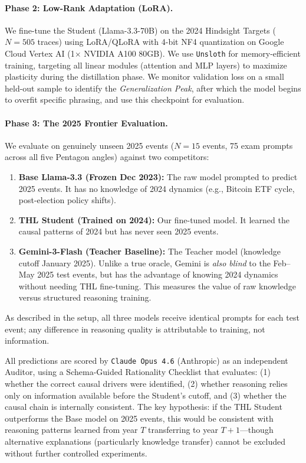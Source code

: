 \documentclass[11pt,a4paper]{article}
\begin{document}
\paragraph{Phase 2: Low-Rank Adaptation (LoRA).}
We fine-tune the Student (Llama-3.3-70B) on the 2024 Hindsight Targets ($N=505$ traces) using LoRA/QLoRA \cite{hu2022lora, dettmers2023qlora} with 4-bit NF4 quantization on Google Cloud Vertex AI (1$\times$ NVIDIA A100 80GB). We use \texttt{Unsloth} for memory-efficient training, targeting all linear modules (attention and MLP layers) to maximize plasticity during the distillation phase. We monitor validation loss on a small held-out sample to identify the \textit{Generalization Peak}, after which the model begins to overfit specific phrasing, and use this checkpoint for evaluation.

\paragraph{Phase 3: The 2025 Frontier Evaluation.}
We evaluate on genuinely unseen 2025 events ($N=15$ events, 75 exam prompts across all five Pentagon angles) against two competitors:
\begin{enumerate}
    \item \textbf{Base Llama-3.3 (Frozen Dec 2023):} The raw model prompted to predict 2025 events. It has no knowledge of 2024 dynamics (e.g., Bitcoin ETF cycle, post-election policy shifts).
    \item \textbf{THL Student (Trained on 2024):} Our fine-tuned model. It learned the causal patterns of 2024 but has never seen 2025 events.
    \item \textbf{Gemini-3-Flash (Teacher Baseline):} The Teacher model (knowledge cutoff January 2025). Unlike a true oracle, Gemini is \textit{also blind} to the Feb--May 2025 test events, but has the advantage of knowing 2024 dynamics without needing THL fine-tuning. This measures the value of raw knowledge versus structured reasoning training.
\end{enumerate}
As described in the setup, all three models receive identical prompts for each test event; any difference in reasoning quality is attributable to training, not information.

All predictions are scored by \texttt{Claude Opus 4.6} (Anthropic) as an independent Auditor, using a Schema-Guided Rationality Checklist that evaluates: (1) whether the correct causal drivers were identified, (2) whether reasoning relies only on information available before the Student's cutoff, and (3) whether the causal chain is internally consistent. The key hypothesis: if the THL Student outperforms the Base model on 2025 events, this would be consistent with reasoning patterns learned from year $T$ transferring to year $T+1$---though alternative explanations (particularly knowledge transfer) cannot be excluded without further controlled experiments.
\end{document}
